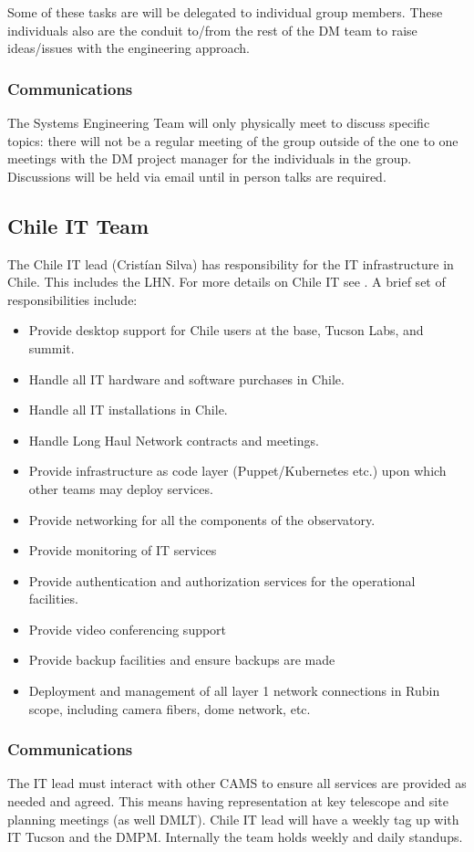 Some of these tasks are will be delegated to individual group members.
These individuals also are the conduit to/from the rest of the DM team to raise ideas/issues with the engineering approach.

\subsubsection{Communications}

The Systems Engineering Team will only physically meet to discuss specific topics: there will not be a regular meeting of the group outside of the one to one meetings with the DM project manager for the individuals in the group.
Discussions will be held via email until in person talks are required.


\subsection{Chile IT Team \label{sect:chit}}
The Chile IT lead (Cristían Silva) has responsibility for the IT infrastructure in Chile. This includes the \gls{LHN}.
For more details on Chile IT see .
A brief set of responsibilities include:
\begin{itemize}
\item Provide desktop support for Chile users at the base, Tucson Labs, and summit.
\item Handle all IT hardware and software purchases in Chile.
\item Handle all IT installations in Chile.
\item Handle Long Haul Network contracts and meetings.
\item Provide infrastructure as code layer (Puppet/Kubernetes etc.) upon which other teams may deploy services.
\item Provide networking for all the components of the observatory.
\item Provide monitoring of IT services
\item Provide authentication and authorization services for the operational facilities.
\item Provide video conferencing support
\item Provide backup facilities and ensure backups are made
\item Deployment and management of all layer 1 network connections in Rubin scope, including camera fibers, dome network, etc.
\end{itemize}

\subsubsection{Communications}
The IT lead must interact with other CAMS to ensure all services are provided as needed and agreed.
This means having representation at key telescope and site planning meetings (as well DMLT).
Chile IT lead will have a weekly tag up with IT Tucson and the DMPM.
Internally the team holds weekly and daily standups.

